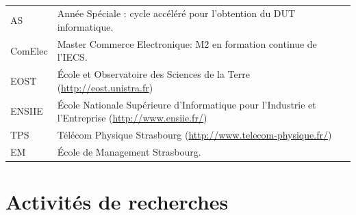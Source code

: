 \documentclass[11pt]{article}
\begin{document}
\begin{table}[H]
\begin{center}
{\begin{tabular}{|c|c|p{6cm}|c|c|c|c|}
\end{tabular}\\
\medskip
\begin{tabular}{lp{14cm}}
AS		& Année Spéciale : cycle accéléré pour l'obtention du DUT informatique.\\
ComElec	& Master Commerce Electronique: M2 en formation continue de l'IECS.\\
EOST 		& \'Ecole et Observatoire des Sciences de la Terre (\url{http://eost.unistra.fr})\\
ENSIIE	& \'Ecole Nationale Supérieure d'Informatique pour l'Industrie et l'Entreprise (\url{http://www.ensiie.fr/})\\
TPS		& Télécom Physique Strasbourg (\url{http://www.telecom-physique.fr/})\\
EM		& \'Ecole de Management Strasbourg. \\
\end{tabular}
}
\label{sc:tab-ens}
\end{center}
\end{table}

\newpage
\section{Activités de recherches}
\end{document}
